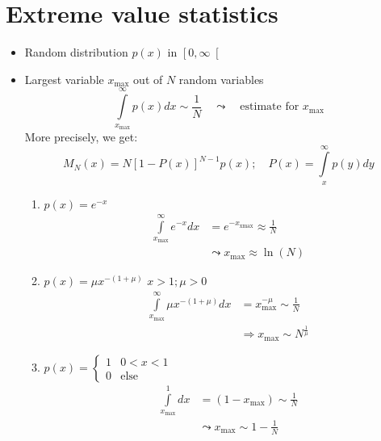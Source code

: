 \documentclass[12 pt]{article}
\begin{document}
\section{Extreme value statistics}
\begin{itemize}[label={$-$}]
	\item Random distribution $p(x)$ in $\left[0,\infty\right[$
	\item Largest variable $x_\text{max}$ out of $N$ random variables
		\begin{equation*}
			\int\limits_{x_\text{max}}^\infty p(x)dx\sim\frac{1}{N} \quad \leadsto \quad \text{estimate for $x_\text{max}$}
		\end{equation*}
		More precisely, we get:
		\begin{equation*}
			M_N(x)=N\left[1-P(x)\right]^{N-1}p(x);\quad P(x)=\int\limits_x^\infty p(y)dy
		\end{equation*}
		\begin{enumerate}[label={\alph*)}]
			\item $p(x)=e^{-x}$
				\begin{align*}
					\int\limits_{x_\text{max}}^\infty e^{-x}dx &= e^{-x_\text{xmax}}\approx\frac{1}{N}\\
					&\leadsto x_\text{max}\approx\ln(N)
				\end{align*}
			\item $p(x)=\mu x^{-(1+\mu)}$ $x>1;\mu>0$
				\begin{align*}
					\int\limits_{x_\text{max}}^\infty \mu x^{-(1+\mu)}dx&=x_\text{max}^{-\mu}\sim\frac{1}{N}\\
					&\Rightarrow x_\text{max}\sim N^\frac{1}{\mu}
				\end{align*}
			\item $p(x)=\begin{cases} 1 & 0<x<1 \\ 0 & \text{else}\end{cases}$
				\begin{align*}
					\int\limits_{x_\text{max}}^1dx&=\left(1-x_\text{max}\right)\sim\frac{1}{N}\\
					&\leadsto x_\text{max}\sim 1-\frac{1}{N}
				\end{align*}
		\end{enumerate}
\end{itemize}
\end{document}
